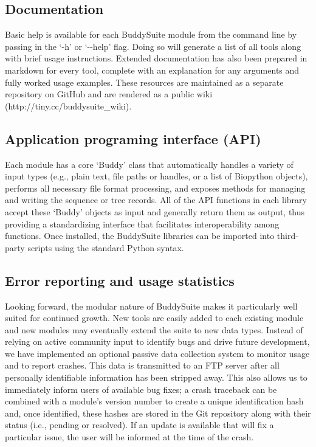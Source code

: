\documentclass[twocolumn]{bmcart}%
\begin{document}
\subsection*{Documentation}
Basic help is available for each BuddySuite module from the command line by passing in the `-h' or `-{}-help' flag. Doing so will generate a list of all tools along with brief usage instructions. Extended documentation has also been prepared in markdown for every tool, complete with an explanation for any arguments and fully worked usage examples. These resources are maintained as a separate repository on GitHub and are rendered as a public wiki (http://tiny.cc/buddysuite\_wiki).

\subsection*{Application programing interface (API)}
Each module has a core `Buddy' class that automatically handles a variety of input types (e.g., plain text, file paths or handles, or a list of Biopython objects), performs all necessary file format processing, and exposes methods for managing and writing the sequence or tree records. All of the API functions in each library accept these `Buddy' objects as input and generally return them as output, thus providing a standardizing interface that facilitates interoperability among functions. Once installed, the BuddySuite libraries can be imported into third-party scripts using the standard Python syntax.

\subsection*{Error reporting and usage statistics}
Looking forward, the modular nature of BuddySuite makes it particularly well suited for continued growth. New tools are easily added to each existing module and new modules may eventually extend the suite to new data types. Instead of relying on active community input to identify bugs and drive future development, we have implemented an optional passive data collection system to monitor usage and to report crashes. This data is transmitted to an FTP server after all personally identifiable information has been stripped away. This also allows us to immediately inform users of available bug fixes; a crash traceback can be combined with a module's version number to create a unique identification hash and, once identified, these hashes are stored in the Git repository along with their status (i.e., pending or resolved). If an update is available that will fix a particular issue, the user will be informed at the time of the crash. 
\end{document}
